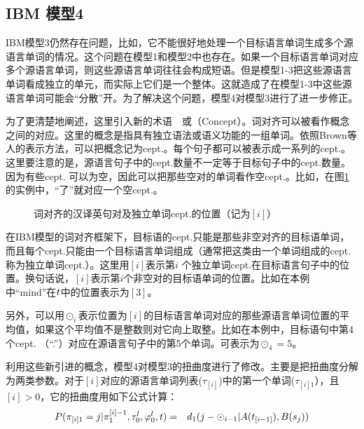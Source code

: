 \subsection{IBM 模型4}

\parinterval IBM模型3仍然存在问题，比如，它不能很好地处理一个目标语言单词生成多个源语言单词的情况。这个问题在模型1和模型2中也存在。如果一个目标语言单词对应多个源语言单词，则这些源语言单词往往会构成短语。但是模型1-3把这些源语言单词看成独立的单元，而实际上它们是一个整体。这就造成了在模型1-3中这些源语言单词可能会“分散”开。为了解决这个问题，模型4对模型3进行了进一步修正。

\parinterval 为了更清楚地阐述，这里引入新的术语\ \dash \ {\small{}}或{\small{}}（Concept）。词对齐可以被看作概念之间的对应。这里的概念是指具有独立语法或语义功能的一组单词。依照Brown等人的表示方法，可以把概念记为cept.。每个句子都可以被表示成一系列的cept.。这里要注意的是，源语言句子中的cept.数量不一定等于目标句子中的cept.数量。因为有些cept. 可以为空，因此可以把那些空对的单词看作空cept.。比如，在图\ref{fig:6-8}的实例中，“了”就对应一个空cept.。

\begin{figure}[htp]
    \centering

   \caption{词对齐的汉译英句对及独立单词cept.的位置（记为$[i]$）}
   \label{fig:6-8}
\end{figure}

\parinterval 在IBM模型的词对齐框架下，目标语的cept.只能是那些非空对齐的目标语单词，而且每个cept.只能由一个目标语言单词组成（通常把这类由一个单词组成的cept.称为独立单词cept.）。这里用$[i]$表示第$i$ 个独立单词cept.在目标语言句子中的位置。换句话说，$[i]$表示第$i$个非空对的目标语单词的位置。比如在本例中“mind”在${t}$中的位置表示为$[3]$。

\parinterval 另外，可以用$\odot_{i}$表示位置为$[i]$的目标语言单词对应的那些源语言单词位置的平均值，如果这个平均值不是整数则对它向上取整。比如在本例中，目标语句中第4个cept. （“.”）对应在源语言句子中的第5个单词。可表示为${\odot}_{4}=5$。

\parinterval 利用这些新引进的概念，模型4对模型3的扭曲度进行了修改。主要是把扭曲度分解为两类参数。对于$[i]$对应的源语言单词列表($\tau_{[i]}$)中的第一个单词($\tau_{[i]1}$），且$[i]>0$，它的扭曲度用如下公式计算：
\begin{eqnarray}
{P}(\pi_{[i]1}=j|{\pi}_1^{[i]-1},{\tau}_0^l,{\varphi}_0^l,{t}) & = & d_{1}(j-{\odot}_{i-1}|A(t_{[i-1]}),B(s_j))
\label{eq:6-22}
\end{eqnarray}


